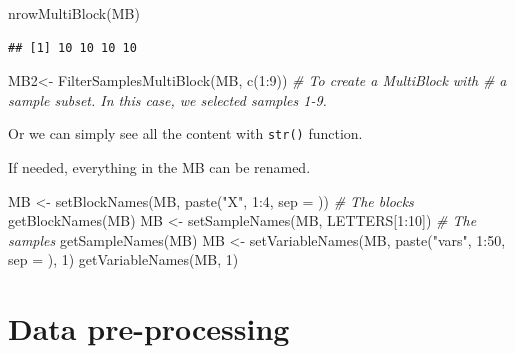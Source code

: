 \documentclass[
]{book}
\newenvironment{Shaded}{\begin{snugshade}}{\end{snugshade}}
\newcommand{\AttributeTok}[1]{\textcolor[rgb]{0.77,0.63,0.00}{#1}}
\newcommand{\CommentTok}[1]{\textcolor[rgb]{0.56,0.35,0.01}{\textit{#1}}}
\newcommand{\DecValTok}[1]{\textcolor[rgb]{0.00,0.00,0.81}{#1}}
\newcommand{\FunctionTok}[1]{\textcolor[rgb]{0.00,0.00,0.00}{#1}}
\newcommand{\NormalTok}[1]{#1}
\newcommand{\OtherTok}[1]{\textcolor[rgb]{0.56,0.35,0.01}{#1}}
\newcommand{\SpecialCharTok}[1]{\textcolor[rgb]{0.00,0.00,0.00}{#1}}
\newcommand{\StringTok}[1]{\textcolor[rgb]{0.31,0.60,0.02}{#1}}
\begin{document}
\begin{Shaded}
\begin{Highlighting}[]
\FunctionTok{nrowMultiBlock}\NormalTok{(MB)}
\end{Highlighting}
\end{Shaded}

\begin{verbatim}
## [1] 10 10 10 10
\end{verbatim}

\begin{Shaded}
\begin{Highlighting}[]
\NormalTok{MB2}\OtherTok{\textless{}{-}} \FunctionTok{FilterSamplesMultiBlock}\NormalTok{(MB, }\FunctionTok{c}\NormalTok{(}\DecValTok{1}\SpecialCharTok{:}\DecValTok{9}\NormalTok{)) }\CommentTok{\# To create a MultiBlock with }
 \CommentTok{\# a sample subset. In this case, we selected samples 1{-}9.}
\end{Highlighting}
\end{Shaded}

Or we can simply see all the content with \texttt{str()} function.

If needed, everything in the MB can be renamed.

\begin{Shaded}
\begin{Highlighting}[]
\NormalTok{MB }\OtherTok{\textless{}{-}} \FunctionTok{setBlockNames}\NormalTok{(MB, }\FunctionTok{paste}\NormalTok{(}\StringTok{"X"}\NormalTok{, }\DecValTok{1}\SpecialCharTok{:}\DecValTok{4}\NormalTok{, }\AttributeTok{sep =} \StringTok{\textquotesingle{}\textquotesingle{}}\NormalTok{)) }\CommentTok{\# The blocks}
\FunctionTok{getBlockNames}\NormalTok{(MB)}
\NormalTok{MB }\OtherTok{\textless{}{-}} \FunctionTok{setSampleNames}\NormalTok{(MB, LETTERS[}\DecValTok{1}\SpecialCharTok{:}\DecValTok{10}\NormalTok{]) }\CommentTok{\# The samples}
\FunctionTok{getSampleNames}\NormalTok{(MB)}
\NormalTok{MB }\OtherTok{\textless{}{-}} \FunctionTok{setVariableNames}\NormalTok{(MB, }\FunctionTok{paste}\NormalTok{(}\StringTok{"vars"}\NormalTok{, }\DecValTok{1}\SpecialCharTok{:}\DecValTok{50}\NormalTok{, }\AttributeTok{sep =} \StringTok{\textquotesingle{}\textquotesingle{}}\NormalTok{), }\DecValTok{1}\NormalTok{)}
\FunctionTok{getVariableNames}\NormalTok{(MB, }\DecValTok{1}\NormalTok{)}
\end{Highlighting}
\end{Shaded}

\hypertarget{processing}{%
\section{Data pre-processing}\label{processing}}
\end{document}

